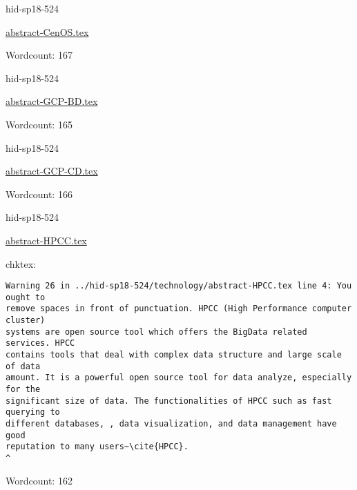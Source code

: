 

\begin{IU}

hid-sp18-524

\href{https://github.com/cloudmesh-community/hid-sp18-524/blob/master//technology/abstract-CenOS.tex}{abstract-CenOS.tex}

 

Wordcount: 167

\end{IU}



\begin{IU}

hid-sp18-524

\href{https://github.com/cloudmesh-community/hid-sp18-524/blob/master//technology/abstract-GCP-BD.tex}{abstract-GCP-BD.tex}

 

Wordcount: 165

\end{IU}



\begin{IU}

hid-sp18-524

\href{https://github.com/cloudmesh-community/hid-sp18-524/blob/master//technology/abstract-GCP-CD.tex}{abstract-GCP-CD.tex}

 

Wordcount: 166

\end{IU}



\begin{IU}

hid-sp18-524

\href{https://github.com/cloudmesh-community/hid-sp18-524/blob/master//technology/abstract-HPCC.tex}{abstract-HPCC.tex}

 
chktex:
\begin{tiny}
\begin{verbatim}
Warning 26 in ../hid-sp18-524/technology/abstract-HPCC.tex line 4: You ought to
remove spaces in front of punctuation. HPCC (High Performance computer cluster)
systems are open source tool which offers the BigData related services. HPCC
contains tools that deal with complex data structure and large scale of data
amount. It is a powerful open source tool for data analyze, especially for the
significant size of data. The functionalities of HPCC such as fast querying to
different databases, , data visualization, and data management have good
reputation to many users~\cite{HPCC}.
^
\end{verbatim}
\end{tiny}

Wordcount: 162

\end{IU}

